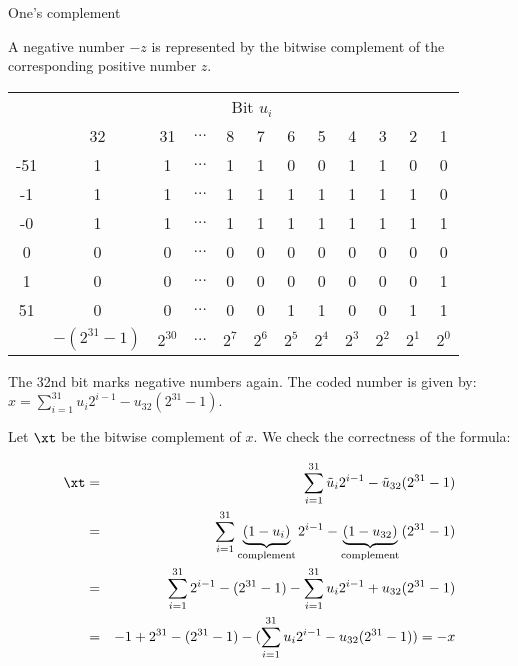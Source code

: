\documentclass[11pt,compress,t,notes=noshow, xcolor=table]{beamer}
\begin{document}
\begin{vbframe}{One's complement}

A negative number $-z$ is represented by the bitwise complement of the corresponding positive number $z$.

\begin{footnotesize}
\begin{center}
  \begin{tabular}{ c | ccccccccccc}
    & \multicolumn{11}{c}{Bit $u_i$} \\
     & 32 & 31  & $\hdots$ & 8 & 7 & 6 & 5 & 4 & 3 & 2 & 1 \\
    \hline
    -51 & 1 & 1 & $\hdots$ & 1 & 1 & 0 & 0 & 1 & 1 & 0 & 0 \\
     -1 & 1 & 1 & $\hdots$ & 1 & 1 & 1 & 1 & 1 & 1 & 1 & 0 \\
     -0 & 1 & 1 & $\hdots$ & 1 & 1 & 1 & 1 & 1 & 1 & 1 & 1 \\
      0 & 0 & 0 & $\hdots$ & 0 & 0 & 0 & 0 & 0 & 0 & 0 & 0 \\
      1 & 0 & 0 & $\hdots$ & 0 & 0 & 0 & 0 & 0 & 0 & 0 & 1 \\
     51 & 0 & 0 & $\hdots$ & 0 & 0 & 1 & 1 & 0 & 0 & 1 & 1 \\
    \hline
       & $-(2^{31} - 1)$ & $2^{30}$ & $\hdots$ & $2^7$ & $2^6$ & $2^5$ & $2^4$ & $2^3$ & $2^2$ & $2^1$ & $2^0$
  \end{tabular}
\end{center}
\end{footnotesize}

The 32nd bit marks negative numbers again.
The coded number is given by: $x = \sum_{i=1}^{31} u_i 2^{i-1} - u_{32}(2^{31} - 1)$.

\framebreak

Let $\xt$ be the bitwise complement of $x$. We check the correctness of the formula: 

\vspace*{-.5cm}

\begin{eqnarray*}
  \xt &=& \sum_{i=1}^{31} \tilde u_i 2^{i-1} - \tilde u_{32}(2^{31} - 1) \\
  &=& \sum_{i=1}^{31} \underbrace{(1 - u_i)}_{\text{complement}} 2^{i-1} - \underbrace{(1 - u_{32})}_{\text{complement}}{(2^{31} - 1)}\\
  &=& \sum_{i=1}^{31} 2^{i-1} - (2^{31} - 1) - \sum_{i=1}^{31} u_i 2^{i-1} + u_{32}(2^{31} - 1)\\
  &=& -1 + 2^{31} - (2^{31} - 1) - (\sum_{i=1}^{31} u_i 2^{i-1} - u_{32}(2^{31} - 1)) = - x
\end{eqnarray*}



\end{vbframe}
\end{document}
